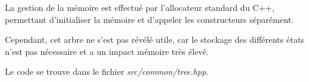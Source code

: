 La gestion de la mémoire est effectué par l'allocateur standard du C++,
permettant d'initialiser la mémoire et d'appeler les constructeurs séparément.

Cependant, cet arbre ne s'est pas révélé utile, car le stockage des différents
états n'est pas nécessaire et a un impact mémoire très élevé.

Le code se trouve dans le fichier \emph{src/common/tree.hpp}.

